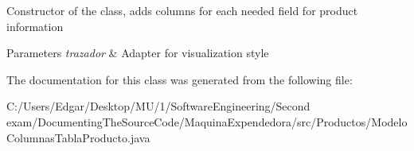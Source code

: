 Constructor of the class, adds columns for each needed field for product information 
\begin{DoxyParams}{Parameters}
{\em trazador} & Adapter for visualization style \\
\hline
\end{DoxyParams}


The documentation for this class was generated from the following file\+:\begin{DoxyCompactItemize}
\item 
C\+:/\+Users/\+Edgar/\+Desktop/\+M\+U/1/\+Software\+Engineering/\+Second exam/\+Documenting\+The\+Source\+Code/\+Maquina\+Expendedora/src/\+Productos/Modelo\+Columnas\+Tabla\+Producto.\+java\end{DoxyCompactItemize}
